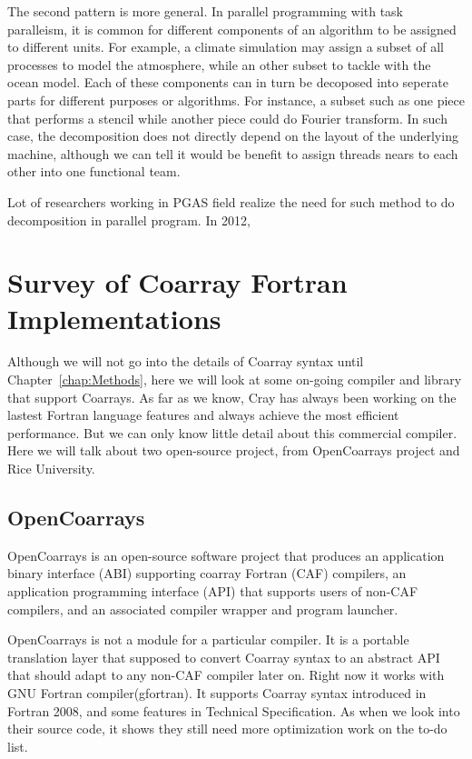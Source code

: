 The second pattern is more general. In parallel programming with task paralleism, it is common for different components of an algorithm to be assigned to different units. For example, a climate simulation may assign a subset of all processes to model the atmosphere, while an other subset to tackle with the ocean model. Each of these components can in turn be decoposed into seperate parts for different purposes or algorithms. For instance, a subset such as one piece that performs a stencil while another piece could do Fourier transform. In such case, the decomposition does not directly depend on the layout of the underlying machine, although we can tell it would be benefit to assign threads nears to each other into one functional team.

Lot of researchers working in PGAS field realize the need for such method to do decomposition in parallel program. In 2012, 


\section{Survey of Coarray Fortran Implementations}\label{sec:survey}

Although we will not go into the details of Coarray syntax until Chapter~\ref{chap:Methods}, here we will look at some on-going compiler and library that support Coarrays. As far as we know, Cray has always been working on the lastest Fortran language features and always achieve the most efficient performance. But we can only know little detail about this commercial compiler. Here we will talk about two open-source project, from OpenCoarrays project and Rice University. 

\subsection{OpenCoarrays}
OpenCoarrays\cite{opencoarrays} is an open-source software project that produces an application binary interface (ABI) supporting coarray Fortran (CAF) compilers, an application programming interface (API) that supports users of non-CAF compilers, and an associated compiler wrapper and program launcher.

OpenCoarrays is not a module for a particular compiler. It is a portable translation layer that supposed to convert Coarray syntax to an abstract API that should adapt to any non-CAF compiler later on. Right now it works with GNU Fortran compiler(gfortran). It supports Coarray syntax introduced in Fortran 2008, and some features in Technical Specification. As when we look into their source code, it shows they still need more optimization work on the to-do list. 

